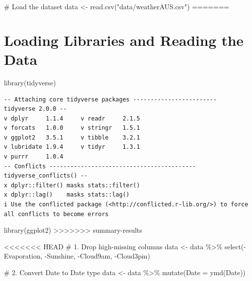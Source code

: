 \documentclass[
  letterpaper,
  DIV=11,
  numbers=noendperiod]{scrartcl}
\newenvironment{Shaded}{\begin{snugshade}}{\end{snugshade}}
\newcommand{\AttributeTok}[1]{\textcolor[rgb]{0.40,0.45,0.13}{#1}}
\newcommand{\CommentTok}[1]{\textcolor[rgb]{0.37,0.37,0.37}{#1}}
\newcommand{\FunctionTok}[1]{\textcolor[rgb]{0.28,0.35,0.67}{#1}}
\newcommand{\NormalTok}[1]{\textcolor[rgb]{0.00,0.23,0.31}{#1}}
\newcommand{\OtherTok}[1]{\textcolor[rgb]{0.00,0.23,0.31}{#1}}
\newcommand{\SpecialCharTok}[1]{\textcolor[rgb]{0.37,0.37,0.37}{#1}}
\newcommand{\StringTok}[1]{\textcolor[rgb]{0.13,0.47,0.30}{#1}}
\begin{document}
\begin{Shaded}
\begin{Highlighting}[]
\CommentTok{\# Load the dataset}
\NormalTok{data }\OtherTok{\textless{}{-}} \FunctionTok{read.csv}\NormalTok{(}\StringTok{"data/weatherAUS.csv"}\NormalTok{)}
=======
\section{Loading Libraries and Reading the
Data}\label{loading-libraries-and-reading-the-data}

\begin{Shaded}
\begin{Highlighting}[]
\FunctionTok{library}\NormalTok{(tidyverse)}
\end{Highlighting}
\end{Shaded}

\begin{verbatim}
-- Attaching core tidyverse packages ------------------------ tidyverse 2.0.0 --
v dplyr     1.1.4     v readr     2.1.5
v forcats   1.0.0     v stringr   1.5.1
v ggplot2   3.5.1     v tibble    3.2.1
v lubridate 1.9.4     v tidyr     1.3.1
v purrr     1.0.4     
-- Conflicts ------------------------------------------ tidyverse_conflicts() --
x dplyr::filter() masks stats::filter()
x dplyr::lag()    masks stats::lag()
i Use the conflicted package (<http://conflicted.r-lib.org/>) to force all conflicts to become errors
\end{verbatim}

\begin{Shaded}
\begin{Highlighting}[]
\FunctionTok{library}\NormalTok{(ggplot2)}
>>>>>>> summary-results
\end{Highlighting}
\end{Shaded}

\begin{Shaded}
\begin{Highlighting}[]
<<<<<<< HEAD
\CommentTok{\# 1. Drop high{-}missing columns}
\NormalTok{data }\OtherTok{\textless{}{-}}\NormalTok{ data }\SpecialCharTok{\%\textgreater{}\%}
  \FunctionTok{select}\NormalTok{(}\SpecialCharTok{{-}}\NormalTok{Evaporation, }\SpecialCharTok{{-}}\NormalTok{Sunshine, }\SpecialCharTok{{-}}\NormalTok{Cloud9am, }\SpecialCharTok{{-}}\NormalTok{Cloud3pm)}
\end{Highlighting}
\end{Shaded}

\begin{Shaded}
\begin{Highlighting}[]
\CommentTok{\# 2. Convert \textquotesingle{}Date\textquotesingle{} to Date type}
\NormalTok{data }\OtherTok{\textless{}{-}}\NormalTok{ data }\SpecialCharTok{\%\textgreater{}\%}
  \FunctionTok{mutate}\NormalTok{(}\AttributeTok{Date =} \FunctionTok{ymd}\NormalTok{(Date))}
\end{Highlighting}
\end{Shaded}


\end{Highlighting}
\end{Shaded}
\end{document}
